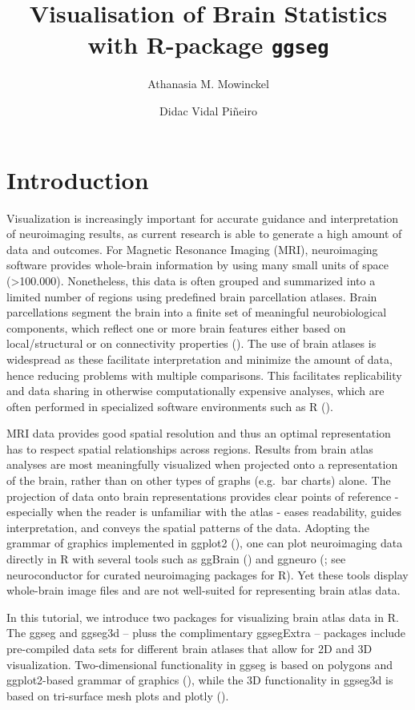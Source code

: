 \documentclass[fleqn,10pt]{wlpeerj} %
\title{Visualisation of Brain Statistics with R-package \texttt{ggseg}}
\author[1]{Athanasia M. Mowinckel}
\author[1]{Didac Vidal Piñeiro}
\affil[1]{Center for Lifespan Changes in Brain and Cognition, Univeristy of Oslo, PO. box 1094 Blindern, 0317 Oslo, Norway}
\begin{document}
\flushbottom
\maketitle
\thispagestyle{empty}

\hypertarget{introduction}{%
\section{Introduction}\label{introduction}}

Visualization is increasingly important for accurate guidance and interpretation of neuroimaging results, as current research is able to generate a high amount of data and outcomes.
For Magnetic Resonance Imaging (MRI), neuroimaging software provides whole-brain information by using many small units of space (\textgreater100.000).
Nonetheless, this data is often grouped and summarized into a limited number of regions using predefined brain parcellation atlases.
Brain parcellations segment the brain into a finite set of meaningful neurobiological components, which reflect one or more brain features either based on local/structural or on connectivity properties (\citet{eickhoff_2018}).
The use of brain atlases is widespread as these facilitate interpretation and minimize the amount of data, hence reducing problems with multiple comparisons.
This facilitates replicability and data sharing in otherwise computationally expensive analyses, which are often performed in specialized software environments such as R (\citet{R}).

MRI data provides good spatial resolution and thus an optimal representation has to respect spatial relationships across regions.
Results from brain atlas analyses are most meaningfully visualized when projected onto a representation of the brain, rather than on other types of graphs (e.g.~bar charts) alone.
The projection of data onto brain representations provides clear points of reference - especially when the reader is unfamiliar with the atlas - eases readability, guides interpretation, and conveys the spatial patterns of the data.
Adopting the grammar of graphics implemented in ggplot2 (\citet{ggplot}), one can plot neuroimaging data directly in R with several tools such as ggBrain (\citet{ggBrain}) and ggneuro (\citet{ggneuro}; see neuroconductor \citeyearpar{neuroconductor} for curated neuroimaging packages for R).
Yet these tools display whole-brain image files and are not well-suited for representing brain atlas data.

In this tutorial, we introduce two packages for visualizing brain atlas data in R.
The ggseg and ggseg3d -- pluss the complimentary ggsegExtra -- packages include pre-compiled data sets for different brain atlases that allow for 2D and 3D visualization.
Two-dimensional functionality in ggseg is based on polygons and ggplot2-based grammar of graphics (\citet{ggplot}), while the 3D functionality in ggseg3d is based on tri-surface mesh plots and plotly (\citet{plotly}).
\end{document}
